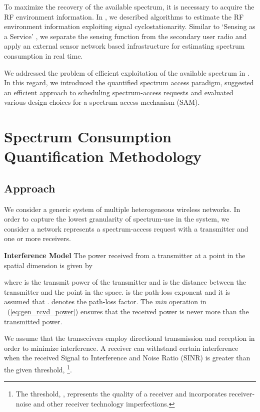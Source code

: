 \documentclass[journal,12pt,draftclsnofoot,onecolumn]{IEEEtran}
\begin{document}
To maximize the recovery of the available spectrum, it is necessary to acquire the RF environment information.  In \cite{sgn_icnc}, we described algorithms to estimate the RF environment information exploiting signal cyclostationarity. Similar to `Sensing as a Service' \cite{saas_weiss}, we separate the sensing function from the secondary user radio and apply an external sensor network based infrastructure for estimating spectrum consumption in real time\cite{oms4_sce}. 

We addressed the problem of efficient exploitation of the available spectrum in \cite{oms3_cf1}. In this regard, we introduced the quantified spectrum access paradigm, suggested an efficient approach to scheduling spectrum-access requests and evaluated various design choices for a spectrum access mechanism (SAM). 

\section{Spectrum Consumption Quantification Methodology}

\subsection{Approach}
We consider a generic system of multiple heterogeneous wireless networks. In order to capture the lowest granularity of spectrum-use in the system, we consider a network represents a spectrum-access request with a transmitter and one or more receivers. 

\noindent
\textbf{Interference Model}
The power received from a transmitter  at a point  in the spatial dimension is given by 

where  is the transmit power of the transmitter and  is the distance between the transmitter  and the point  in the space.  is the path-loss exponent and it is assumed that .   denotes the path-loss factor. The \textit{min} operation in ~(\ref{eq:gen_rcvd_power}) ensures that the received power is never more than the transmitted power.

We assume that the transceivers employ directional transmission and reception in order to minimize interference. A receiver can withstand certain interference when the received Signal to Interference and Noise Ratio (SINR) is greater than the given threshold, \footnote{The threshold, , represents the quality of a receiver and incorporates receiver-noise and other receiver technology imperfections.}. 
\end{document}
